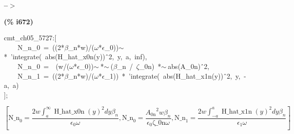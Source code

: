 \documentclass[fleqn]{article}
\begin{document}
\noindent
\begin{minipage}[t]{4.000000em}\color{red}\bfseries
 --\ensuremath{\ensuremath{>}}	
\end{minipage}
\begin{minipage}[t]{\textwidth}\color{blue}

\end{minipage}

\noindent%



\noindent
\begin{minipage}[t]{4.000000em}\color{red}\bfseries
(\% i672)	
\end{minipage}
\begin{minipage}[t]{\textwidth}\color{blue}
cmt\_ch05\_5727:[\\
\ \ \ \ N\_n\_0\ =\ ((2*\ensuremath{\beta}\_n*w)/(\ensuremath{\omega}*\ensuremath{\epsilon}\_0))\ensuremath{\sim\ }*\ 'integrate(\ abs(H\_hat\_x0n(y))\^\ 2,\ y,\ a,\ inf),\\
\ \ \ \ N\_n\_0\ =\ \ (w/(\ensuremath{\omega}*\ensuremath{\epsilon}\_0))\ensuremath{\sim\ }*\ensuremath{\sim\ }(\ensuremath{\beta}\_n\ /\ \ensuremath{\zeta}\_0n)\ *\ensuremath{\sim\ }abs(A\_0n)\^\ 2,\\
\ \ \ \ N\_n\_1\ =\ ((2*\ensuremath{\beta}\_n*w)/(\ensuremath{\omega}*\ensuremath{\epsilon}\_1))\ *\ 'integrate(\ abs(H\_hat\_x1n(y))\^\ 2,\ y,\ -a,\ a)\ \ \ \\
];
\end{minipage}
\[\displaystyle \tag{\% o672} 
\operatorname{[}{{\ensuremath{\mathrm{N\_ n}}}_0}=\frac{2 w \int_{a}^{\infty }{\left. {{\operatorname{H\_ hat\_ x0n}(y)}^{2}}dy\right.} {{\beta }_n}}{{{\epsilon }_0} \omega }\operatorname{,}{{\ensuremath{\mathrm{N\_ n}}}_0}=\frac{{{{A_{\ensuremath{\mathrm{0n}}}}}^{2}} w {{\beta }_n}}{{{\epsilon }_0} \ensuremath{\mathrm{\zeta \_ 0n}} \omega }\operatorname{,}{{\ensuremath{\mathrm{N\_ n}}}_1}=
\frac{2 w \int_{-a}^{a}{\left. {{\operatorname{H\_ hat\_ x1n}(y)}^{2}}dy\right.} {{\beta }_n}}{{{\epsilon }_1} \omega }\operatorname{]}\mbox{}
\]
\end{document}
